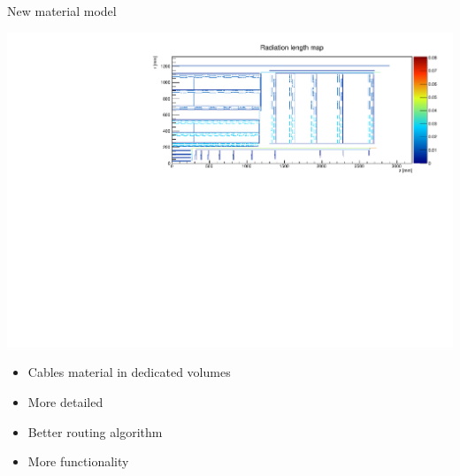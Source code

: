 \documentclass[pdftex, 11pt]{beamer}
\begin{document}
\begin{frame}{New material model}
  \begin{center}
    \includegraphics[width=\textwidth]{img/newModel.pdf}
  \end{center}
  \begin{itemize}
  \item Cables material in \alert{dedicated} volumes
  \item More \alert{detailed}
  \item Better routing \alert{algorithm}
  \item More \alert{functionality}
  \end{itemize}
\end{frame}
\end{document}
